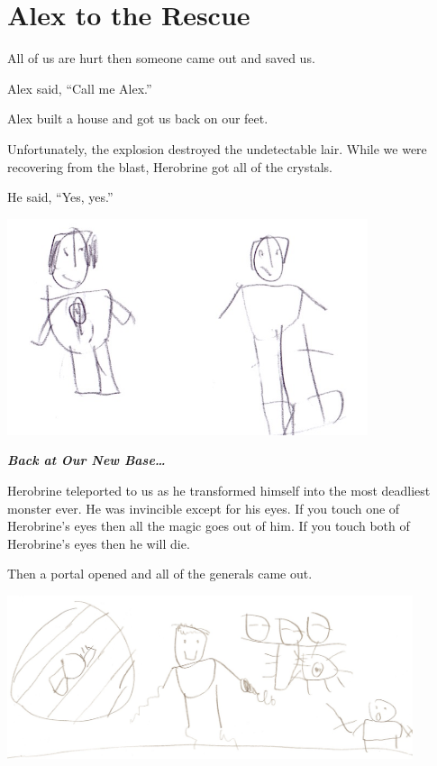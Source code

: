 \documentclass[12pt,oneside]{krantz}
\begin{document}
\hypertarget{alex-to-the-rescue}{%
\chapter{Alex to the Rescue}\label{alex-to-the-rescue}}

All of us are hurt then someone came out and saved us.

Alex said, ``Call me Alex.''

Alex built a house and got us back on our feet.

Unfortunately, the explosion destroyed the undetectable lair. While we
were recovering from the blast, Herobrine got all of the crystals.

He said, ``Yes, yes.''

\includegraphics[width=4.16667in,height=\textheight]{img/final-war/alex-herobrine.jpg}

\textbf{\emph{Back at Our New Base\ldots{}}}

Herobrine teleported to us as he transformed himself into the most
deadliest monster ever. He was invincible except for his eyes. If you
touch one of Herobrine's eyes then all the magic goes out of him. If you
touch both of Herobrine's eyes then he will die.

Then a portal opened and all of the generals came out.

\includegraphics[width=4.6875in,height=\textheight]{img/final-war/herobrine.jpg}
\end{document}
